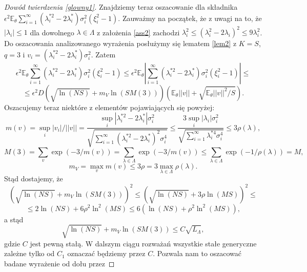 \documentclass{article}
\begin{document}
\begin{proof}[Dowód twierdzenia \ref{glowny1}]
Znajdziemy teraz oszacowanie dla składnika $\epsilon^2\mathbb{E}_{\theta}\sum_{i=1}^{\infty}(\lambda_i^{*2}-2\lambda_i^*)\sigma_i^2(\xi_i^2-1)$. Zauważmy na początek, że z uwagi na to, że $|\lambda_i|\leq 1$ dla dowolnego $\lambda\in \Lambda$ z założenia \ref{ass2} zachodzi $\lambda_i^2\leq (\lambda_i^2-2\lambda_i)^2\leq 9\lambda_i^2$. Do oszacowania analizowanego wyrażenia posłużymy się lematem \ref{lem2} z $K=S$, $q=3$ i $v_i=(\lambda_i^{*2}-2\lambda_i^*)\sigma_i^2$. Zatem
\begin{displaymath}
\epsilon^2\mathbb{E}_{\theta}\sum_{i=1}^{\infty}(\lambda_i^{*2}-2\lambda_i^*)\sigma_i^2(\xi_i^2-1)\leq \epsilon^2\mathbb{E}_{\theta}\left|\sum_{i=1}^{\infty}(\lambda_i^{*2}-2\lambda_i^*)\sigma_i^2(\xi_i^2-1)\right|\leq
\end{displaymath}
\begin{displaymath}
\leq \epsilon^2D\left(\sqrt{\ln (NS)}+m_V\ln (SM(3))\right)\left(\mathbb{E}_{\theta}||v||+\sqrt{\mathbb{E}_{\theta}||v||^2/S}\right).
\end{displaymath}
Oszacujemy teraz niektóre z elementów pojawiających się powyżej:
\begin{displaymath}
m(v)=\sup_i|v_i|/||v||=\frac{\sup_i|\lambda_i^{*2}-2\lambda_i^*|\sigma_i^2}{\sqrt{\sum_{i=1}^{\infty}(\lambda_i^{*2}-2\lambda_i^*)^2\sigma_i^4}}\leq \frac{3\sup_i|\lambda_i|\sigma_i^2}{\sqrt{\sum_{i=1}^{\infty}\lambda_i^{*4}\sigma_i^4}}\leq 3\rho (\lambda),
\end{displaymath}
\begin{displaymath}
M(3)=\sum_{v}\exp (-3/m(v))=\sum_{\lambda\in \Lambda}\exp (-3/m(v))\leq \sum_{\lambda\in \Lambda}\exp (-1/\rho(\lambda))=M,
\end{displaymath}
\begin{displaymath}
m_V=\max_{v}m(v)\leq 3\rho=3\max_{\lambda\in \Lambda}\rho(\lambda).
\end{displaymath}
Stąd dostajemy, że 
\begin{displaymath}
\left(\sqrt{\ln (NS)}+m_V\ln (SM(3))\right)^2\leq \left(\sqrt{\ln (NS)}+3\rho\ln (MS)\right)^2\leq 
\end{displaymath}
\begin{displaymath}
\leq 2\ln (NS)+6\rho^2\ln^2 (MS)\leq 6(\ln (NS)+\rho^2\ln^2 (MS)),
\end{displaymath}
a stąd
\begin{displaymath}
\sqrt{\ln (NS)}+m_V\ln (SM(3))\leq C\sqrt{L_{\Lambda}},
\end{displaymath}
gdzie $C$ jest pewną stałą. W dalszym ciągu rozważań wszystkie stałe generyczne zależne tylko od $C_1$ oznaczać będziemy przez $C$. Pozwala nam to oszacować badane wyrażenie od dołu przez

\end{proof}
\end{document}
